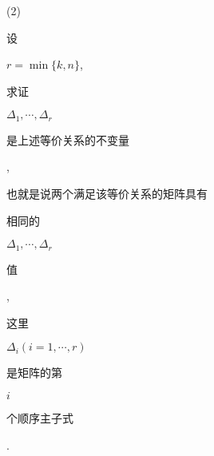 \documentclass[10pt]{article}
\begin{document}
(2) \begin{CJK}{UTF8}{mj}设\end{CJK} $r=\min \{k, n\}$, \begin{CJK}{UTF8}{mj}求证\end{CJK} $\Delta_{1}, \cdots, \Delta_{r}$ \begin{CJK}{UTF8}{mj}是上述等价关系的不变量\end{CJK}, \begin{CJK}{UTF8}{mj}也就是说两个满足该等价关系的矩阵具有\end{CJK} \begin{CJK}{UTF8}{mj}相同的\end{CJK} $\Delta_{1}, \cdots, \Delta_{r}$ \begin{CJK}{UTF8}{mj}值\end{CJK}, \begin{CJK}{UTF8}{mj}这里\end{CJK} $\Delta_{i}(i=1, \cdots, r)$ \begin{CJK}{UTF8}{mj}是矩阵的第\end{CJK} $i$ \begin{CJK}{UTF8}{mj}个顺序主子式\end{CJK}.
\end{document}
